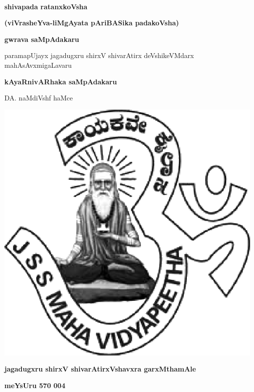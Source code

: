 ~\thispagestyle{empty}

\vfill

\begin{center}
{\fontsize{50}{50}\selectfont\bfseries shivapada ratanxkoVsha}\relax

\medskip

{\LARGE\bfseries (viVrasheYva-liMgAyata pAriBASika padakoVsha)}
\end{center}

\vfill


\begin{center}
{\large\bf gwrava saMpAdakaru}

\medskip

{\large paramapUjayx jagadugxru shirxV shivarAtirx deVshikeVMdarx mahAsAvxmigaLavaru}

\bigskip
\bigskip

{\large\bf kAyaRnivARhaka saMpAdakaru}

\medskip

{\large DA. naMdiVshf haMce}

\end{center}

\vfill


\centerline{\includegraphics[scale=.3]{JSSlogo.eps}}

\medskip

\centerline{\large\bfseries jagadugxru shirxV shivarAtirxVshavxra  garxMthamAle}

\smallskip

\centerline{\large\bfseries meYsUru  570 004}
